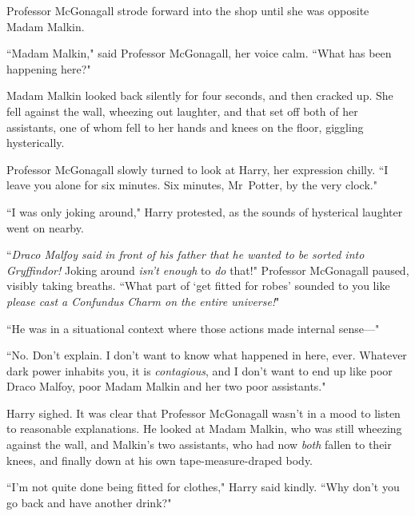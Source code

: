 Professor McGonagall strode forward into the shop until she was opposite Madam Malkin.

``Madam Malkin," said Professor McGonagall, her voice calm. ``What has been happening here?"

Madam Malkin looked back silently for four seconds, and then cracked up. She fell against the wall, wheezing out laughter, and that set off both of her assistants, one of whom fell to her hands and knees on the floor, giggling hysterically.

Professor McGonagall slowly turned to look at Harry, her expression chilly. ``I leave you alone for six minutes. Six minutes, Mr~Potter, by the very clock."

``I was only joking around," Harry protested, as the sounds of hysterical laughter went on nearby.

``\emph{Draco Malfoy said in front of his father that he wanted to be sorted into Gryffindor!} Joking around \emph{isn't enough} to \emph{do} that!" Professor McGonagall paused, visibly taking breaths. ``What part of `get fitted for robes' sounded to you like \emph{please cast a Confundus Charm on the entire universe!}"

``He was in a situational context where those actions made internal sense—"

``No. Don't explain. I don't want to know what happened in here, ever. Whatever dark power inhabits you, it is \emph{contagious}, and I don't want to end up like poor Draco Malfoy, poor Madam Malkin and her two poor assistants."

Harry sighed. It was clear that Professor McGonagall wasn't in a mood to listen to reasonable explanations. He looked at Madam Malkin, who was still wheezing against the wall, and Malkin's two assistants, who had now \emph{both} fallen to their knees, and finally down at his own tape-measure-draped body.

``I'm not quite done being fitted for clothes," Harry said kindly. ``Why don't you go back and have another drink?"

